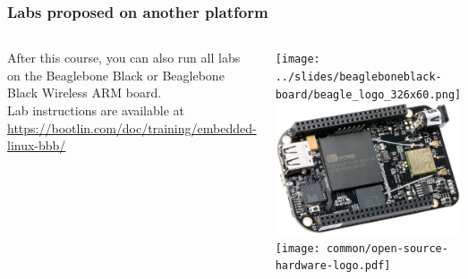 \begin{frame}
\frametitle{Labs proposed on another platform}
  \begin{columns}
    After this course, you can also run all labs on the Beaglebone Black
    or Beaglebone Black Wireless ARM board.\\
    \vspace{1em}
    Lab instructions are available at\\
    {\small \url{https://bootlin.com/doc/training/embedded-linux-bbb/}}
    \begin{center}
      \texttt{[image: ../slides/beagleboneblack-board/beagle\_logo\_326x60.png]}\\
      \includegraphics[width=\textwidth]{../slides/beagleboneblack-board/beagleboneblack.png}\\
      \texttt{[image: common/open-source-hardware-logo.pdf]}
    \end{center}
  \end{columns}
\end{frame}
